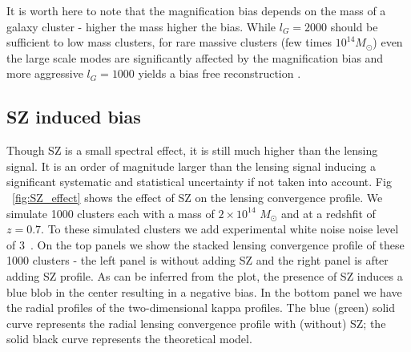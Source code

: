 It is worth here to note that the magnification bias depends on the mass of a galaxy cluster - higher the mass higher the bias. While $l_{G} = 2000$ should be sufficient to low mass clusters, for rare massive clusters (few times $10^{14} M_{\odot}$) even the large scale modes are significantly affected by the magnification bias and more aggressive $l_{G}  = 1000$ yields a bias free reconstruction \citep{hu07}. 
  
 
\subsection{SZ induced bias}
\label{sec_sz_induced_bias}
Though SZ is a small spectral effect, it is still much higher than the lensing signal. 
 It is an order of magnitude larger than the lensing signal inducing a significant systematic and statistical uncertainty if not taken into account. 
Fig ~\ref{fig:SZ_effect} shows the effect of SZ on the lensing convergence profile. 
 We simulate 1000 clusters each with a mass of $2 \times 10^{14}$ $M_{\odot}$ and at a redshfit of $z= 0.7$.
 To these simulated clusters we add experimental white noise noise level of 3\ukam\ 
. On the top panels we show the stacked lensing convergence profile of these 1000 clusters - the left panel is without adding SZ and the right panel is after adding \citet{arnaud10} SZ profile. %
 As can be inferred from the plot, the presence of SZ induces a blue blob in the center resulting in a negative bias.
 In the bottom panel we have the radial profiles of the two-dimensional kappa profiles.
 The blue (green) solid curve represents the radial lensing convergence profile with (without) SZ; the solid black curve represents the theoretical model.


